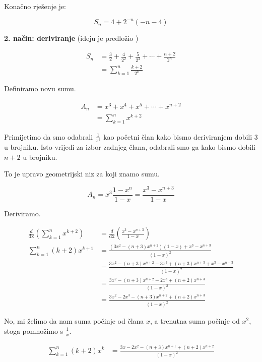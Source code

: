 \documentclass[exam.tex]{subfiles}
\begin{document}
	Konačno rješenje je:
	
	\[ S_n = 4 + 2^{-n} (-n -4) \]
	
	\newpage
	
	\textbf{2. način: deriviranje} (ideju je predložio \UkiseljeniKrastavac)
	
	\begin{align*}
		S_n &= \frac{3}{2} + \frac{4}{2^2} + \frac{5}{2^3} + \cdots + \frac{n+2}{2^n}  \\
		&= \sum\limits_{k=1}^n \frac{k + 2}{2^k}
	\end{align*}
	
	Definiramo novu sumu.
	
	\begin{align*}
		A_n &= x^3 + x^4 + x^5 + \cdots + x^{n + 2} \\
		&= \sum\limits_{k=1}^n x^{k + 2}
	\end{align*}
	
	Primijetimo da smo odabrali \( \frac{1}{x^3} \) kao početni član kako bismo deriviranjem dobili \( 3 \) u brojniku. Isto vrijedi za izbor zadnjeg člana, odabrali smo ga kako bismo dobili \( n + 2 \) u brojniku.
	
	To je upravo geometrijski niz za koji znamo sumu.
	
	\[ A_n = x^3 \frac{1 - x^n}{1 - x} = \frac{x^3 - x^{n + 3}}{1 - x} \]
	
	Deriviramo.
	
	\begin{align*}
		\frac{d}{\mathop{dx}} \left ( \sum\limits_{k=1}^n x^{k + 2} \right ) &= \frac{d}{\mathop{dx}} \left ( \frac{x^3 - x^{n + 3}}{1 - x} \right ) \\
		\sum\limits_{k=1}^n (k + 2) x^{k + 1} &= \frac{(3x^2 - (n + 3)x^{n + 2})(1 - x) + x^3 - x^{n + 3}}{(1 - x)^2}  \\
		&= \frac{3x^2 - (n + 3)x^{n + 2} - 3x^3 + (n + 3)x^{n + 3} + x^3 - x^{n + 3}}{(1 - x)^2}  \\
		&= \frac{3x^2 - (n + 3)x^{n + 2} - 2x^3 + (n + 2)x^{n + 3}}{(1 - x)^2}  \\
		&= \frac{3x^2 - 2x^3 - (n + 3)x^{n + 2} + (n + 2)x^{n + 3}}{(1 - x)^2} 
	\end{align*}
	
	No, mi želimo da nam suma počinje od člana \( x \), a trenutna suma počinje od \( x^2 \), stoga pomnožimo s \( \frac{1}{x} \).
	
	\begin{align*}
		\sum\limits_{k=1}^n (k + 2) x^k	&= \frac{3x - 2x^2 - (n + 3)x^{n + 1} + (n + 2)x^{n + 2}}{(1 - x)^2} 
	\end{align*}
	
\end{document}
